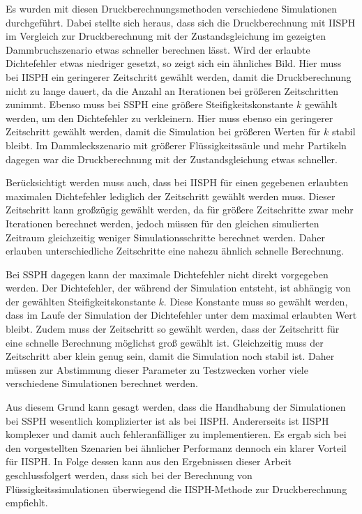 \documentclass[11pt,
a4paper,
parskip=half, %
BCOR=10mm, %
english,
ngerman]{scrreprt}
\begin{document}
Es wurden mit diesen Druckberechnungsmethoden verschiedene Simulationen durchgeführt.
Dabei stellte sich heraus,
dass sich die Druckberechnung mit IISPH im Vergleich zur Druckberechnung mit der Zustandsgleichung im gezeigten Dammbruchszenario etwas schneller berechnen lässt.
Wird der erlaubte Dichtefehler etwas niedriger gesetzt, so zeigt sich ein ähnliches Bild.
Hier muss bei IISPH ein geringerer Zeitschritt gewählt werden, damit die Druckberechnung nicht zu lange dauert, da die Anzahl an Iterationen bei größeren Zeitschritten zunimmt.
Ebenso muss bei SSPH eine größere Steifigkeitskonstante $k$ gewählt werden, um den Dichtefehler zu verkleinern.
Hier muss ebenso ein geringerer Zeitschritt gewählt werden, damit die Simulation bei größeren Werten für $k$ stabil bleibt.
Im Dammleckszenario mit größerer Flüssigkeitssäule und mehr Partikeln dagegen war die Druckberechnung mit der Zustandsgleichung etwas schneller.

Berücksichtigt werden muss auch, dass bei IISPH für einen gegebenen erlaubten maximalen Dichtefehler lediglich der Zeitschritt gewählt werden muss.
Dieser Zeitschritt kann großzügig gewählt werden, da für größere Zeitschritte zwar mehr Iterationen berechnet werden,
jedoch müssen für den gleichen simulierten Zeitraum gleichzeitig weniger Simulationsschritte berechnet werden.
Daher erlauben unterschiedliche Zeitschritte eine nahezu ähnlich schnelle Berechnung.

Bei SSPH dagegen kann der maximale Dichtefehler nicht direkt vorgegeben werden.
Der Dichtefehler, der während der Simulation entsteht, ist abhängig von der gewählten Steifigkeitskonstante $k$.
Diese Konstante muss so gewählt werden, dass im Laufe der Simulation der Dichtefehler unter dem maximal erlaubten Wert bleibt.
Zudem muss der Zeitschritt so gewählt werden, dass der Zeitschritt für eine schnelle Berechnung möglichst groß gewählt ist.
Gleichzeitig muss der Zeitschritt aber klein genug sein, damit die Simulation noch stabil ist.
Daher müssen zur Abstimmung dieser Parameter zu Testzwecken vorher viele verschiedene Simulationen berechnet werden.

Aus diesem Grund kann gesagt werden, dass die Handhabung der Simulationen bei SSPH wesentlich komplizierter ist als bei IISPH.
Andererseits ist IISPH komplexer und damit auch fehleranfälliger zu implementieren.
Es ergab sich bei den vorgestellten Szenarien bei ähnlicher Performanz dennoch ein klarer Vorteil für IISPH.
In Folge dessen kann aus den Ergebnissen dieser Arbeit geschlussfolgert werden,
dass sich bei der Berechnung von Flüssigkeitssimulationen überwiegend die IISPH-Methode zur Druckberechnung empfiehlt.




\end{document}
